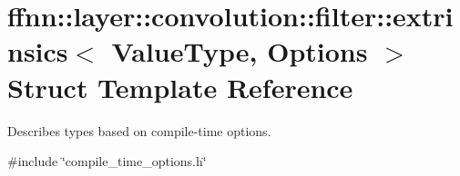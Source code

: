 \hypertarget{structffnn_1_1layer_1_1convolution_1_1filter_1_1extrinsics}{\section{ffnn\-:\-:layer\-:\-:convolution\-:\-:filter\-:\-:extrinsics$<$ Value\-Type, Options $>$ Struct Template Reference}
\label{structffnn_1_1layer_1_1convolution_1_1filter_1_1extrinsics}
}


Describes types based on compile-\/time options.  




{\ttfamily \#include \char`\"{}compile\-\_\-time\-\_\-options.\-h\char`\"{}}

